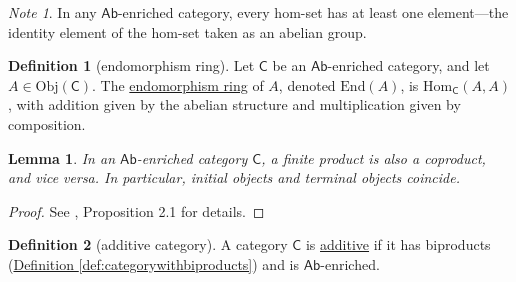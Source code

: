 \documentclass[a4paper,10pt]{scrreprt}
\newcommand{\defn}[1]{\ul{#1}}
\newcommand{\Obj}{\mathrm{Obj}}
\newcommand{\Hom}{\mathrm{Hom}}
\theoremstyle{definition}
\newtheorem{definition}{Definition}[section]
\theoremstyle{plain}
\newtheorem{lemma}{Lemma}[section]
\theoremstyle{remark}
\newtheorem{note}{Note}[section]
\begin{document}
\begin{note}
  \label{note:inabenrichedcategorynoemptyhomsets}
  In any $\mathsf{Ab}$-enriched category, every hom-set has at least one element---the identity element of the hom-set taken as an abelian group.
\end{note}

\begin{definition}[endomorphism ring]
  \label{def:endomorphismring}
  Let $\mathsf{C}$ be an $\mathsf{Ab}$-enriched category, and let $A \in \Obj(\mathsf{C})$. The \defn{endomorphism ring} of $A$, denoted $\mathrm{End}(A)$, is $\Hom_{\mathsf{C}}(A, A)$, with addition given by the abelian structure and multiplication given by composition.
\end{definition}

\begin{lemma}
  \label{lemma:abeliancategorycoproductsareproducts}
  In an $\mathsf{Ab}$-enriched category $\mathsf{C}$, a finite product is also a coproduct, and vice versa. In particular, initial objects and terminal objects coincide.
\end{lemma}
\begin{proof}


  See \cite{nlab-additive-category}, Proposition 2.1 for details.
\end{proof}

\begin{definition}[additive category]
  \label{def:additivecategory}
  A category $\mathsf{C}$ is \defn{additive} if it has biproducts (\hyperref[def:categorywithbiproducts]{Definition \ref*{def:categorywithbiproducts}}) and is $\mathsf{Ab}$-enriched.
\end{definition}
\end{document}

